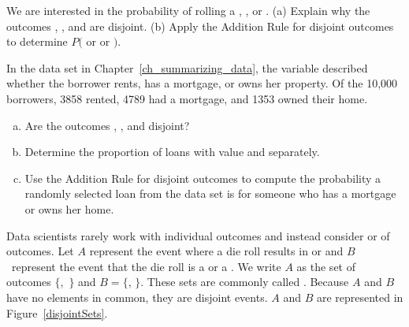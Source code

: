 \D{\newpage}

\begin{exercisewrap}
\begin{nexercise}
We are interested in the probability of rolling a , , or . (a) Explain why the outcomes , , and  are disjoint. (b) Apply the Addition Rule for disjoint outcomes to determine $P($ or  or $)$.\footnotemark
\end{nexercise}
\end{exercisewrap}

\begin{exercisewrap}
\begin{nexercise}
In the  data set in Chapter~\ref{ch_summarizing_data},
the  variable described whether the borrower
rents, has a mortgage, or owns her property.
Of the 10,000 borrowers, 3858 rented, 4789 had a mortgage,
and 1353 owned their home.\footnotemark{}
\begin{enumerate}[(a)]
\setlength{\itemsep}{0mm}
\item
    Are the outcomes , ,
    and  disjoint?
\item
    Determine the proportion of loans with value 
    and  separately.
\item
    Use the Addition Rule for disjoint outcomes to compute
    the probability a randomly selected loan from the data set
    is for someone who has a mortgage or owns her
    home.
\end{enumerate}
\end{nexercise}
\end{exercisewrap}


Data scientists rarely work with individual outcomes and instead consider  or  of outcomes. Let $A$ represent the event where a die roll results in  or  and $B$~represent the event that the die roll is a  or a . We write $A$ as the set of outcomes $\{$,~$\}$ and $B=\{$, $\}$. These sets are commonly called . Because $A$ and $B$ have no elements in common, they are disjoint events. $A$ and $B$ are represented in Figure~\ref{disjointSets}.

